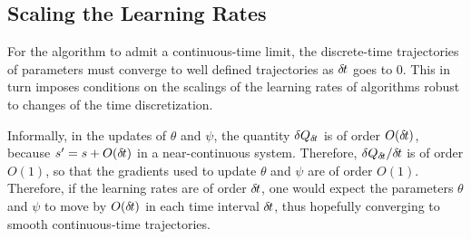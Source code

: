 
\subsection{Scaling the Learning Rates}
\label{subsec:lr}

For the algorithm to admit a continuous-time limit, the discrete-time trajectories
of parameters must converge to well defined trajectories as ${\delta\hspace{-.1em}t}$ goes to
$0$.
This in turn imposes conditions on the scalings of the
learning rates of algorithms robust to changes of the time discretization.

Informally, in the updates of $\theta$ and $\psi$, the quantity $\delta
Q_{\delta\hspace{-.1em}t}$ is of order $O({\delta\hspace{-.1em}t})$, because $s'=s+O({\delta\hspace{-.1em}t})$ in a
near-continuous system. Therefore, $\delta
Q_{\delta\hspace{-.1em}t}/{\delta\hspace{-.1em}t}$ is of order $O(1)$, so that the gradients used to
update $\theta$ and $\psi$ are of order $O(1)$. Therefore, if the
learning rates are of order ${\delta\hspace{-.1em}t}$, one would expect 
the parameters $\theta$ and $\psi$ to move by $O({\delta\hspace{-.1em}t})$ in
each time interval ${\delta\hspace{-.1em}t}$, thus hopefully converging to smooth
continuous-time trajectories.


